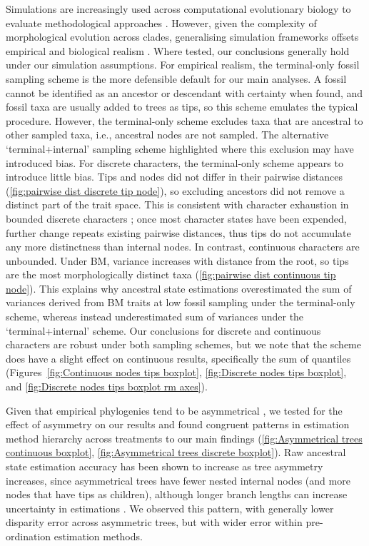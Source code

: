 \documentclass[11pt, a4paper]{article}
\begin{document}
Simulations are increasingly used across computational evolutionary biology to evaluate methodological approaches \citep{lotterhos2022simulation}.
However, given the complexity of morphological evolution across clades, generalising simulation frameworks offsets empirical and biological realism \citep{goloboff2018parsimony,o2018empirical}.
Where tested, our conclusions generally hold under our simulation assumptions.
For empirical realism, the terminal-only fossil sampling scheme is the more defensible default for our main analyses.
A fossil cannot be identified as an ancestor or descendant with certainty when found, and fossil taxa are usually added to trees as tips, so this scheme emulates the typical procedure.
However, the terminal-only scheme excludes taxa that are ancestral to other sampled taxa, i.e., ancestral nodes are not sampled.
The alternative `terminal+internal' sampling scheme highlighted where this exclusion may have introduced bias. 
For discrete characters, the terminal-only scheme appears to introduce little bias.
Tips and nodes did not differ in their pairwise distances (\autoref{fig:pairwise dist discrete tip node}), so excluding ancestors did not remove a distinct part of the trait space.
This is consistent with character exhaustion in bounded discrete characters \citep{wagner2000exhaustion, erwin_disparity_2007}; once most character states have been expended, further change repeats existing pairwise distances, thus tips do not accumulate any more distinctness than internal nodes.
In contrast, continuous characters are unbounded.
Under BM, variance increases with distance from the root, so tips are the most morphologically distinct taxa (\autoref{fig:pairwise dist continuous tip node}).
This explains why ancestral state estimations overestimated the sum of variances derived from BM traits at low fossil sampling under the terminal-only scheme, whereas instead underestimated sum of variances under the `terminal+internal' scheme.
Our conclusions for discrete and continuous characters are robust under both sampling schemes, but we note that the scheme does have a slight effect on continuous results, specifically the sum of quantiles (Figures~\ref{fig:Continuous nodes tips boxplot}, \ref{fig:Discrete nodes tips boxplot}, and \ref{fig:Discrete nodes tips boxplot rm axes}).

Given that empirical phylogenies tend to be asymmetrical \citep{mooers1997inferring}, we tested for the effect of asymmetry on our results  and found congruent patterns in estimation method hierarchy across treatments to our main findings (\autoref{fig:Asymmetrical trees continuous boxplot}, \autoref{fig:Asymmetrical trees discrete boxplot}). 
Raw ancestral state estimation accuracy has been shown to increase as tree asymmetry increases, since asymmetrical trees have fewer nested internal nodes (and more nodes that have tips as children), although longer branch lengths can increase uncertainty in estimations \citep{keating2023best}.
We observed this pattern, with generally lower disparity error across asymmetric trees, but with wider error within pre-ordination estimation methods.
\end{document}
